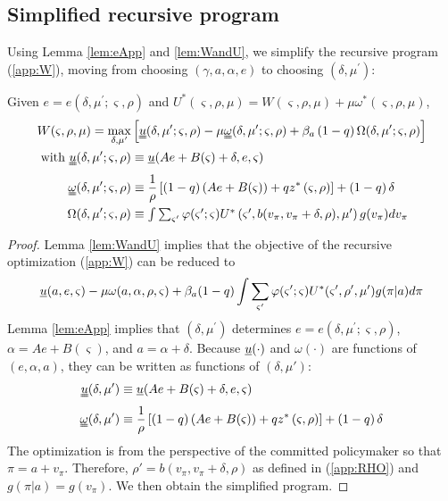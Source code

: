 \documentclass[12pt,letter,leqno]{article}
\theoremstyle{asn}
\theoremstyle{lem}
\theoremstyle{slem}
\theoremstyle{prop}
\theoremstyle{appprop}
\theoremstyle{rem}
\theoremstyle{defn}
\begin{document}
\subsection{Simplified recursive program}\label{app:W2}
Using Lemma \ref{lem:eApp} and \ref{lem:WandU}, we simplify the recursive program (\ref{app:W}), moving from choosing $(\gamma
,a,\alpha ,e)$ to  choosing $(\delta ,\mu ^{\prime
})$:
\begin{appprop}\label{appprop:W2}%
Given $e =e\left( \delta ,\mu ^{\prime };\varsigma ,\rho \right)$ and $U^*\left( \varsigma ,\rho ,\mu \right)=W(\varsigma,\rho,\mu)+\mu\omega^*(\varsigma,\rho,\mu)$, 
\begin{align}
W(\varsigma,\rho,\mu) =\max_{\delta,\mu^{\prime}}&\left[\uuline{u}(
\delta ,\mu ^{\prime };\varsigma,\rho) -\mu \uuline{\omega}(\delta,\mu^{\prime
};\varsigma,\rho)+\beta_{a}\left( 1-q\right) \Omega( \delta ,\mu ^{\prime
};\varsigma,\rho) \right] \label{app:W2} \\
\text{with }\uuline{u}(\delta,\mu';\varsigma,\rho) &\equiv \uline{u}(Ae+B(\varsigma)+\delta,e,\varsigma) \notag \\
\uuline{\omega}(\delta,\mu';\varsigma,\rho) &\equiv \frac{1}{\rho }\left[
\left( 1-q\right) \left( Ae+B(\varsigma )\right) +qz^{\ast }\left( \varsigma
,\rho \right) \right] +\left( 1-q\right) \delta \notag  \\
\Omega( \delta ,\mu ^{\prime} ;\varsigma,\rho )  &\equiv \textstyle\int \textstyle\sum_{\varsigma^{\prime
}}\varphi( \varsigma ^{\prime };\varsigma ) U^*\left( \varsigma
^{\prime },b( v_\pi ,v_\pi+\delta ,\rho) ,\mu ^{\prime }\right) g (v_\pi )dv_\pi \notag 
\end{align}
\end{appprop}
\begin{proof}
Lemma \ref{lem:WandU} implies that the objective of the recursive optimization (\ref{app:W}) can be reduced to
\begin{equation*}
\uline{u}(a,e,\varsigma) - \mu\omega(a,\alpha,\rho,\varsigma) + \beta_a(1-q)\int\sum_{\varsigma'}\varphi(\varsigma';\varsigma)U^*(\varsigma',\rho',\mu')g(\pi|a)d\pi
\end{equation*}
Lemma \ref{lem:eApp} implies that $(\delta ,\mu ^{\prime})$ determines $e=e(\delta ,\mu ^{\prime };\varsigma ,\rho )$, $\alpha=Ae+B(\varsigma )$, and $a=\alpha +\delta$.
Because $\uline{u}(\cdot)$ and $\omega(\cdot)$ are functions of $(e,\alpha,a)$, they can be written as functions of $(\delta,\mu')$:
\begin{align}
\uuline{u}(\delta,\mu') &\equiv \uline{u}(Ae+B(\varsigma)+\delta,e,\varsigma) \\
\uuline{\omega}(\delta,\mu') &\equiv \frac{1}{\rho }\left[
\left( 1-q\right) \left( Ae+B(\varsigma )\right) +qz^{\ast }\left( \varsigma
,\rho \right) \right] +\left( 1-q\right) \delta 
\end{align}
The optimization is from the perspective of the committed policymaker so that $\pi=a+v_{\pi}$. Therefore, $\rho'=b\left( v_\pi,v_\pi +\delta ,\rho \right) $ as defined in (\ref{app:RHO}) and $g(\pi|a)=g(v_\pi)$. We then obtain the simplified program.
\end{proof}
\end{document}
